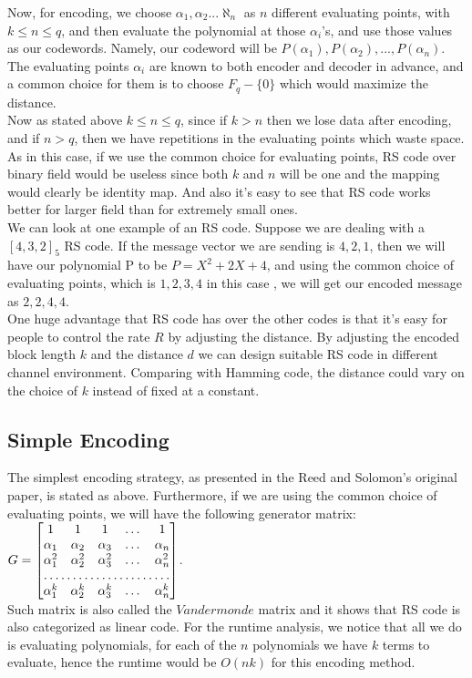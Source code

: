 \documentclass{article}
\begin{document}
Now, for encoding, we choose $\alpha_1, \alpha_2...\aleph_n$ as $n$ different evaluating points, with $k \le n \le q$, and then evaluate the polynomial at those $\alpha_i$'s, and use those values as our codewords. Namely, our codeword will be ${P(\alpha_1), P(\alpha_2) , ... ,P(\alpha_n)}$. The evaluating points $\alpha_i$ are known to both encoder and decoder in advance, and a common choice for them is to choose $F_q - \{0\}$ which would maximize the distance.\\
Now as stated above $k \le n \le q$, since if $k >n$ then we lose data after encoding, and if $n > q$, then we have repetitions in the evaluating points which waste space. As in this case, if we use the common choice for evaluating points, RS code over binary field would be useless since both $k$ and $n$ will be one and the  mapping would clearly be identity map. And also it's easy to see that RS code works better for larger field than for extremely small ones.\\
We can look at one example of an RS code. Suppose we are dealing with a $[4,3,2]_5$ RS code. If the message vector we are sending is ${4, 2, 1}$, then we will have our polynomial P to be $P = X^2 + 2X + 4$, and using the common choice of evaluating points, which is ${1,2,3,4}$ in this case , we will get our encoded message as ${2, 2, 4,4}$.\\
One huge advantage that RS code has over the other codes is that it's easy for people to control the rate $R$ by adjusting the distance. By adjusting the encoded block length $k$ and the distance $d$ we can design suitable RS code in different channel environment. Comparing with Hamming code, the distance could vary on the choice of $k$ instead of fixed at a constant.
\subsection{Simple Encoding}
The simplest encoding strategy, as presented in the Reed and Solomon's original paper, is stated as above. Furthermore, if we are using the common choice of evaluating points, we will have the following generator matrix:\\
$G = \begin{bmatrix}
	1 & 1 & 1 &\dots & 1 \\
	\alpha_1 & \alpha_2 & \alpha_3 & \dots & \alpha_n \\
	\alpha_1^2 & \alpha_2^2 & \alpha_3^2 & \dots & \alpha_n^2  \\
	\hdotsfor{5} \\
	\alpha_1^k & \alpha_2^k & \alpha_3^k & \dots & \alpha_n^k \\
    \end{bmatrix}$.\\
Such matrix is also called the $Vandermonde$ matrix and it shows that RS code is also categorized as linear code. For the runtime analysis, we notice that all we do is evaluating polynomials, for each of the $n$ polynomials we have $k$ terms to evaluate, hence the runtime would be $O(nk)$ for this encoding method.
\end{document}
